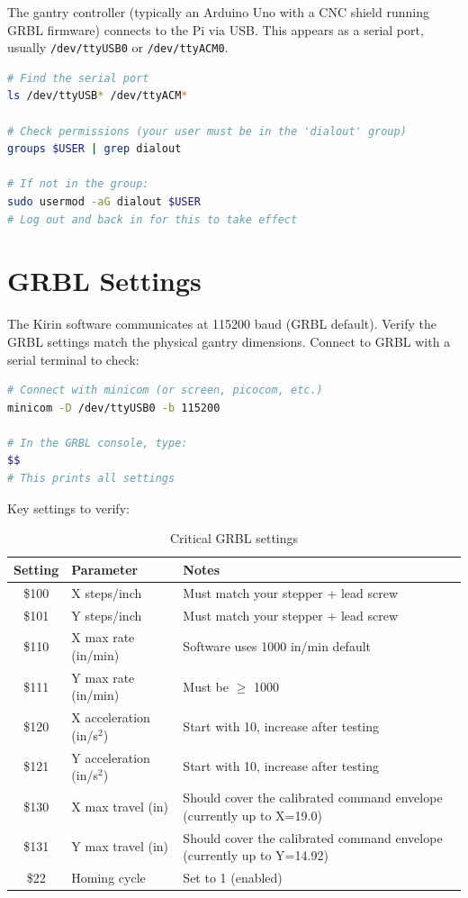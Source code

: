 \documentclass[11pt,a4paper]{report}
\begin{document}
The gantry controller (typically an Arduino Uno with a CNC shield running GRBL firmware) connects to the Pi via USB. This appears as a serial port, usually \texttt{/dev/ttyUSB0} or \texttt{/dev/ttyACM0}.

\begin{lstlisting}[language=bash]
# Find the serial port
ls /dev/ttyUSB* /dev/ttyACM*

# Check permissions (your user must be in the 'dialout' group)
groups $USER | grep dialout

# If not in the group:
sudo usermod -aG dialout $USER
# Log out and back in for this to take effect
\end{lstlisting}

\section{GRBL Settings}

The Kirin software communicates at 115200 baud (GRBL default). Verify the GRBL settings match the physical gantry dimensions. Connect to GRBL with a serial terminal to check:

\begin{lstlisting}[language=bash]
# Connect with minicom (or screen, picocom, etc.)
minicom -D /dev/ttyUSB0 -b 115200

# In the GRBL console, type:
$$
# This prints all settings
\end{lstlisting}

Key settings to verify:

\begin{table}[H]
\centering
\begin{tabular}{clp{7cm}}
\toprule
\textbf{Setting} & \textbf{Parameter} & \textbf{Notes} \\
\midrule
\$100 & X steps/inch & Must match your stepper + lead screw \\
\$101 & Y steps/inch & Must match your stepper + lead screw \\
\$110 & X max rate (in/min) & Software uses 1000 in/min default \\
\$111 & Y max rate (in/min) & Must be $\geq$ 1000 \\
\$120 & X acceleration (in/s$^2$) & Start with 10, increase after testing \\
\$121 & Y acceleration (in/s$^2$) & Start with 10, increase after testing \\
\$130 & X max travel (in) & Should cover the calibrated command envelope (currently up to X=19.0) \\
\$131 & Y max travel (in) & Should cover the calibrated command envelope (currently up to Y=14.92) \\
\$22 & Homing cycle & Set to 1 (enabled) \\
\bottomrule
\end{tabular}
\caption{Critical GRBL settings}
\end{table}
\end{document}
